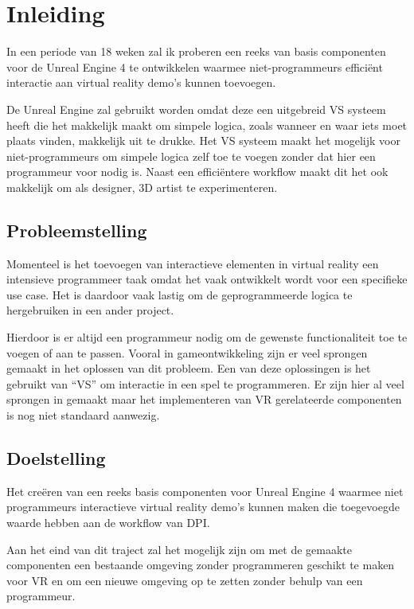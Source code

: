 \chapter{Inleiding}

In een periode van 18 weken zal ik proberen een reeks van basis componenten voor de Unreal Engine 4 te ontwikkelen waarmee niet-programmeurs efficiënt interactie aan virtual reality demo’s kunnen toevoegen.

De Unreal Engine zal gebruikt worden omdat deze een uitgebreid VS systeem heeft die het makkelijk maakt om simpele logica, zoals wanneer en waar iets moet plaats vinden, makkelijk uit te drukke. Het VS systeem maakt het mogelijk voor niet-programmeurs om simpele logica zelf toe te voegen zonder dat hier een programmeur voor nodig is. Naast een efficiëntere workflow maakt dit het ook makkelijk om als designer, 3D artist te experimenteren.

\section{Probleemstelling}

Momenteel is het toevoegen van interactieve elementen in virtual reality een intensieve programmeer taak omdat het vaak ontwikkelt wordt voor een specifieke use case. Het is daardoor vaak lastig om de geprogrammeerde logica te hergebruiken in een ander project. 

Hierdoor is er altijd een programmeur nodig om de gewenste functionaliteit toe te voegen of aan te passen. Vooral in gameontwikkeling zijn er veel sprongen gemaakt in het oplossen van dit probleem. Een van deze oplossingen is het gebruikt van “VS” om interactie in een spel te programmeren. Er zijn hier al veel sprongen in gemaakt maar het implementeren van VR gerelateerde componenten is nog niet standaard aanwezig.

\section{Doelstelling}

Het creëren van een reeks basis componenten voor Unreal Engine 4 waarmee niet programmeurs interactieve virtual reality demo’s kunnen maken die toegevoegde waarde hebben aan de workflow van DPI.

Aan het eind van dit traject zal het mogelijk zijn om met de gemaakte componenten een bestaande omgeving zonder programmeren geschikt te maken voor VR en om een nieuwe omgeving op te zetten zonder behulp van een programmeur.

